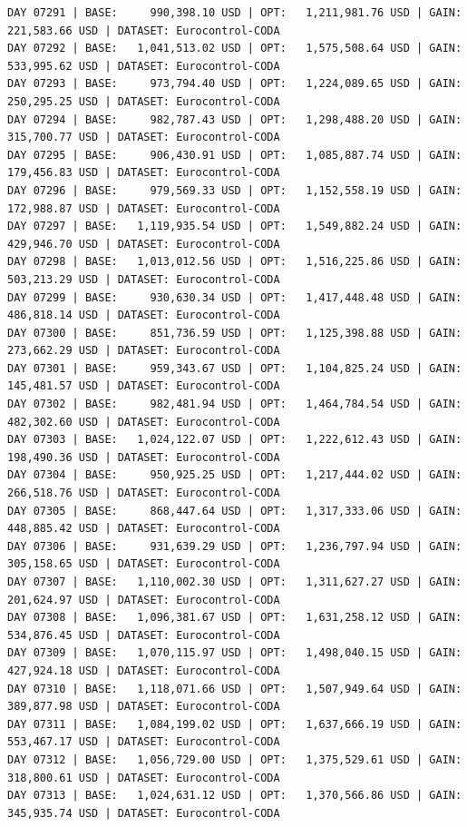 \documentclass[11pt,a4paper]{article}
\begin{document}
\begin{verbatim}
DAY 07291 | BASE:     990,398.10 USD | OPT:   1,211,981.76 USD | GAIN: 221,583.66 USD | DATASET: Eurocontrol-CODA
DAY 07292 | BASE:   1,041,513.02 USD | OPT:   1,575,508.64 USD | GAIN: 533,995.62 USD | DATASET: Eurocontrol-CODA
DAY 07293 | BASE:     973,794.40 USD | OPT:   1,224,089.65 USD | GAIN: 250,295.25 USD | DATASET: Eurocontrol-CODA
DAY 07294 | BASE:     982,787.43 USD | OPT:   1,298,488.20 USD | GAIN: 315,700.77 USD | DATASET: Eurocontrol-CODA
DAY 07295 | BASE:     906,430.91 USD | OPT:   1,085,887.74 USD | GAIN: 179,456.83 USD | DATASET: Eurocontrol-CODA
DAY 07296 | BASE:     979,569.33 USD | OPT:   1,152,558.19 USD | GAIN: 172,988.87 USD | DATASET: Eurocontrol-CODA
DAY 07297 | BASE:   1,119,935.54 USD | OPT:   1,549,882.24 USD | GAIN: 429,946.70 USD | DATASET: Eurocontrol-CODA
DAY 07298 | BASE:   1,013,012.56 USD | OPT:   1,516,225.86 USD | GAIN: 503,213.29 USD | DATASET: Eurocontrol-CODA
DAY 07299 | BASE:     930,630.34 USD | OPT:   1,417,448.48 USD | GAIN: 486,818.14 USD | DATASET: Eurocontrol-CODA
DAY 07300 | BASE:     851,736.59 USD | OPT:   1,125,398.88 USD | GAIN: 273,662.29 USD | DATASET: Eurocontrol-CODA
DAY 07301 | BASE:     959,343.67 USD | OPT:   1,104,825.24 USD | GAIN: 145,481.57 USD | DATASET: Eurocontrol-CODA
DAY 07302 | BASE:     982,481.94 USD | OPT:   1,464,784.54 USD | GAIN: 482,302.60 USD | DATASET: Eurocontrol-CODA
DAY 07303 | BASE:   1,024,122.07 USD | OPT:   1,222,612.43 USD | GAIN: 198,490.36 USD | DATASET: Eurocontrol-CODA
DAY 07304 | BASE:     950,925.25 USD | OPT:   1,217,444.02 USD | GAIN: 266,518.76 USD | DATASET: Eurocontrol-CODA
DAY 07305 | BASE:     868,447.64 USD | OPT:   1,317,333.06 USD | GAIN: 448,885.42 USD | DATASET: Eurocontrol-CODA
DAY 07306 | BASE:     931,639.29 USD | OPT:   1,236,797.94 USD | GAIN: 305,158.65 USD | DATASET: Eurocontrol-CODA
DAY 07307 | BASE:   1,110,002.30 USD | OPT:   1,311,627.27 USD | GAIN: 201,624.97 USD | DATASET: Eurocontrol-CODA
DAY 07308 | BASE:   1,096,381.67 USD | OPT:   1,631,258.12 USD | GAIN: 534,876.45 USD | DATASET: Eurocontrol-CODA
DAY 07309 | BASE:   1,070,115.97 USD | OPT:   1,498,040.15 USD | GAIN: 427,924.18 USD | DATASET: Eurocontrol-CODA
DAY 07310 | BASE:   1,118,071.66 USD | OPT:   1,507,949.64 USD | GAIN: 389,877.98 USD | DATASET: Eurocontrol-CODA
DAY 07311 | BASE:   1,084,199.02 USD | OPT:   1,637,666.19 USD | GAIN: 553,467.17 USD | DATASET: Eurocontrol-CODA
DAY 07312 | BASE:   1,056,729.00 USD | OPT:   1,375,529.61 USD | GAIN: 318,800.61 USD | DATASET: Eurocontrol-CODA
DAY 07313 | BASE:   1,024,631.12 USD | OPT:   1,370,566.86 USD | GAIN: 345,935.74 USD | DATASET: Eurocontrol-CODA

\end{verbatim}
\end{document}
